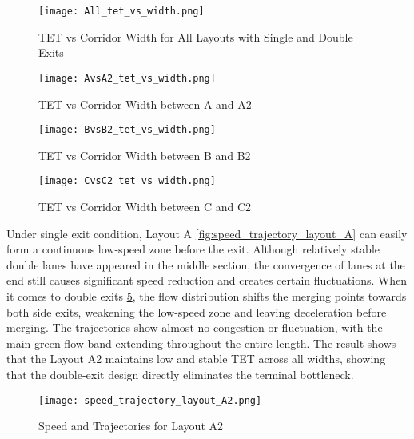 \begin{figure}[h]
    \centering
    \texttt{[image: All\_tet\_vs\_width.png]}
    \caption{TET vs Corridor Width for All Layouts with Single and Double Exits}
    \label{fig:all_tet_vs_width}
\end{figure}

\begin{figure}[h]
    \texttt{[image: AvsA2\_tet\_vs\_width.png]}
    \caption{TET vs Corridor Width between A and A2}\label{fig:AvsA2_tet_vs_width}
\end{figure}

\begin{figure}[h]
    \texttt{[image: BvsB2\_tet\_vs\_width.png]}
    \caption{TET vs Corridor Width between B and B2}\label{fig:BvsB2_tet_vs_width}
\end{figure}

\begin{figure}[h]
    \texttt{[image: CvsC2\_tet\_vs\_width.png]}
    \caption{TET vs Corridor Width between C and C2}\label{fig:CvsC2_tet_vs_width}
\end{figure}
Under single exit condition, Layout A \ref{fig:speed_trajectory_layout_A} can easily form a continuous low-speed zone before the exit. Although relatively stable double lanes have appeared in the middle section, the convergence of lanes at the end still causes significant speed reduction and creates certain fluctuations. When it comes to double exits \ref{fig:speed_trajectory_layout_A2}, the flow distribution shifts the merging points towards both side exits, weakening the low-speed zone and leaving deceleration before merging. The trajectories show almost no congestion or fluctuation, with the main green flow band extending throughout the entire length. The result shows that the Layout A2 maintains low and stable TET across all widths, showing that the double-exit design directly eliminates the terminal bottleneck.

\begin{figure}[h]
    \texttt{[image: speed\_trajectory\_layout\_A2.png]}
    \caption{Speed and Trajectories for Layout A2}\label{fig:speed_trajectory_layout_A2}
\end{figure}

